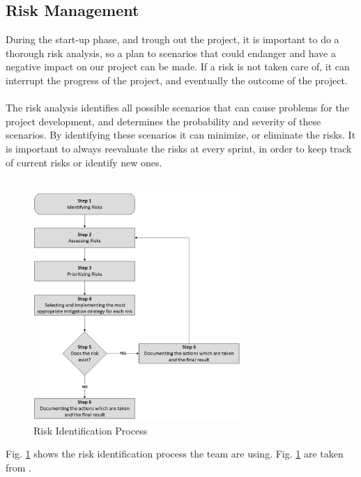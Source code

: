 \subsection{Risk Management}
During the start-up phase, and trough out the project, it is important to do a thorough risk analysis, so a plan to scenarios that could endanger and have a negative impact on our project can be made. If a risk is not taken care of, it can interrupt the progress of the project, and eventually the outcome of the project.
\\\\ 
The risk analysis identifies all possible scenarios that can cause problems for the project development, and determines the probability and severity of these scenarios. By identifying these scenarios it can minimize, or eliminate the risks. It is important to always reevaluate the risks at every sprint, in order to keep track of current risks or identify new ones.
\\\\
\begin{figure}[H]
    \centering
    \includegraphics[width = 0.7\textwidth]{VAPIQ-PICTURES/riskprocess.jpg}
    \caption{Risk Identification Process}
    \label{fig:riskid}
\end{figure}
\clearpage
\noindent
Fig. \ref{fig:riskid} shows the risk identification process the team are using. Fig. \ref{fig:riskid} are taken from \cite{Alberto}.

